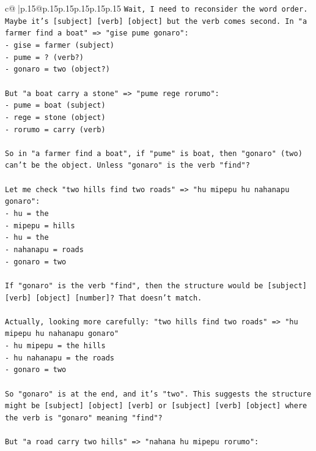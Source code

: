 \documentclass{article}
\begin{document}
{\begin{supertabular}{c@{$\;$}|p{.15\linewidth}@{}p{.15\linewidth}p{.15\linewidth}p{.15\linewidth}p{.15\linewidth}p{.15\linewidth}}
{{{\texttt{Wait, I need to reconsider the word order. Maybe it's {[}subject{]} {[}verb{]} {[}object{]} but the verb comes second. In "a farmer find a boat" => "gise pume gonaro":} \\
\texttt{{-} gise = farmer (subject)} \\
\texttt{{-} pume = ? (verb?)} \\
\texttt{{-} gonaro = two (object?)} \\
\\ 
\texttt{But "a boat carry a stone" => "pume rege rorumo":} \\
\texttt{{-} pume = boat (subject)} \\
\texttt{{-} rege = stone (object)} \\
\texttt{{-} rorumo = carry (verb)} \\
\\ 
\texttt{So in "a farmer find a boat", if "pume" is boat, then "gonaro" (two) can't be the object. Unless "gonaro" is the verb "find"?} \\
\\ 
\texttt{Let me check "two hills find two roads" => "hu mipepu hu nahanapu gonaro":} \\
\texttt{{-} hu = the} \\
\texttt{{-} mipepu = hills} \\
\texttt{{-} hu = the} \\
\texttt{{-} nahanapu = roads} \\
\texttt{{-} gonaro = two} \\
\\ 
\texttt{If "gonaro" is the verb "find", then the structure would be {[}subject{]} {[}verb{]} {[}object{]} {[}number{]}? That doesn't match.} \\
\\ 
\texttt{Actually, looking more carefully: "two hills find two roads" => "hu mipepu hu nahanapu gonaro"} \\
\texttt{{-} hu mipepu = the hills} \\
\texttt{{-} hu nahanapu = the roads} \\
\texttt{{-} gonaro = two} \\
\\ 
\texttt{So "gonaro" is at the end, and it's "two". This suggests the structure might be {[}subject{]} {[}object{]} {[}verb{]} or {[}subject{]} {[}verb{]} {[}object{]} where the verb is "gonaro" meaning "find"?} \\
\\ 
\texttt{But "a road carry two hills" => "nahana hu mipepu rorumo":} \\
}}}
\end{supertabular}}
\end{document}
